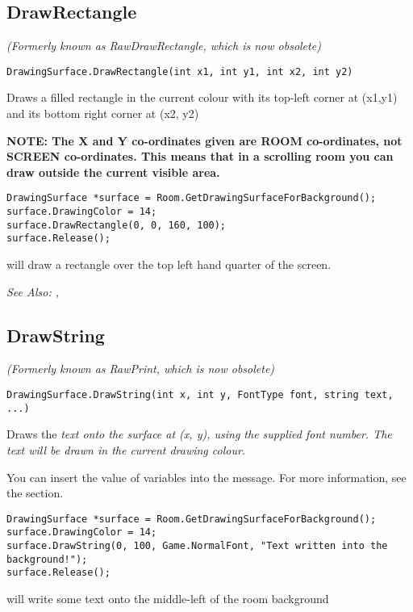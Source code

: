 \subsection{DrawRectangle}\label{DrawingSurface.DrawRectangle}%

\it{(Formerly known as RawDrawRectangle, which is now obsolete)}

\begin{verbatim}
DrawingSurface.DrawRectangle(int x1, int y1, int x2, int y2)
\end{verbatim}
Draws a filled rectangle in the current colour with its top-left corner
at (x1,y1) and its bottom right corner at (x2, y2)

\bf{NOTE:} The X and Y co-ordinates given are ROOM co-ordinates, not SCREEN co-ordinates.
This means that in a scrolling room you can draw outside the current visible area.

\begin{verbatim}
DrawingSurface *surface = Room.GetDrawingSurfaceForBackground();
surface.DrawingColor = 14;
surface.DrawRectangle(0, 0, 160, 100);
surface.Release();
\end{verbatim}
will draw a rectangle over the top left hand quarter of the screen.

\it{See Also:} ,


\subsection{DrawString}\label{DrawingSurface.DrawString}%

\it{(Formerly known as RawPrint, which is now obsolete)}

\begin{verbatim}
DrawingSurface.DrawString(int x, int y, FontType font, string text, ...)
\end{verbatim}
Draws the \it{text} onto the surface at (x, y), using the supplied font number.
The text will be drawn in the current drawing colour.

You can insert the value of variables into the message. For more information,
see the  section.

\begin{verbatim}
DrawingSurface *surface = Room.GetDrawingSurfaceForBackground();
surface.DrawingColor = 14;
surface.DrawString(0, 100, Game.NormalFont, "Text written into the background!");
surface.Release();
\end{verbatim}
will write some text onto the middle-left of the room background

